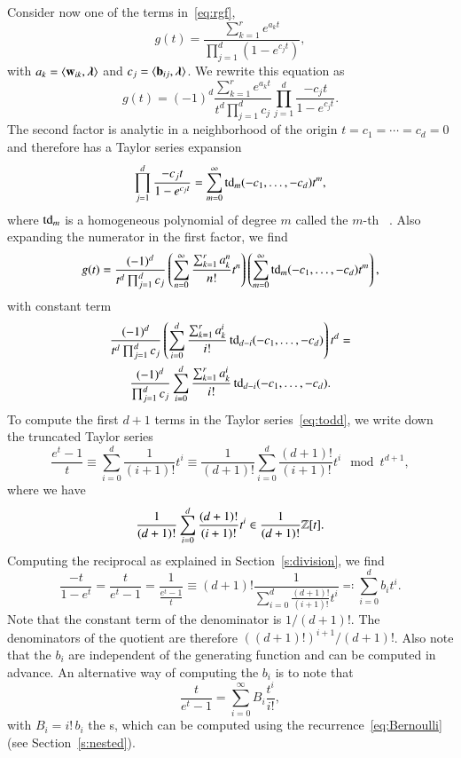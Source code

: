 Consider now one of the terms in~\eqref{eq:rgf},
$$
g(t) =
    \frac{\sum_{k=1}^{r} e^{a_k t}}
	 {\prod_{j=1}^{d}\left(1-e^{c_j t}\right)}
,
$$
with $a_k = \sp{w_{ik}}{\lambda}$ and $c_j = \sp{b_{ij}}{\lambda}$.
We rewrite this equation as
$$
g(t) =
(-1)^d
    \frac{\sum_{k=1}^{r} e^{a_k t}}
	 {t^d \prod_{j=1}^d c_j}
    \prod_{j=1}^d \frac{-c_j t}
	 {1-e^{c_j t}}
.
$$
The second factor is analytic in a neighborhood of the origin
$t = c_1 = \cdots = c_d = 0$ and therefore has a Taylor series expansion
\begin{equation}
\label{eq:todd}
    \prod_{j=1}^d \frac{-c_j t}
	 {1-e^{c_j t}}
=
    \sum_{m=0}^{\infty} \todd_m(-c_1, \ldots, -c_d) t^m
,
\end{equation}
where $\operatorname{td}_m$ is a homogeneous polynomial of degree $m$ called
the $m$-th ~\cite{Barvinok1999}.
Also expanding the numerator in the first factor, we find
$$
g(t)  = \frac{(-1)^d}{t^d \prod_{j=1}^d c_j}
	    \left(
		\sum_{n=0}^{\infty}\frac{\sum_{k=1}^{r} a_k^n}{n!} t^n
	    \right)
	    \left(
		\sum_{m=0}^{\infty} \operatorname{td}_m(-c_1, \ldots, -c_d) t^m
	    \right)
,
$$
with constant term
\begin{multline}
\label{eq:todd:constant}
\frac{(-1)^d}{t^d \prod_{j=1}^d c_j}
    \left(\sum_{i=0}^d \frac{\sum_{k=1}^{r} a_k^i}{i!}
		    \todd_{d-i}(-c_1, \ldots, -c_d)\right)t^d
= \\
\frac{(-1)^d}{\prod_{j=1}^d c_j}
    \sum_{i=0}^d \frac{\sum_{k=1}^{r} a_k^i}{i!} \todd_{d-i}(-c_1, \ldots, -c_d)
.
\end{multline}
To compute the first $d+1$ terms in the Taylor series~\eqref{eq:todd},
we write down the truncated Taylor series
$$
\frac{e^t -1}t \equiv
	\sum_{i=0}^d \frac 1{(i+1)!} t^i \equiv
	\frac 1 {(d+1)!} \sum_{i=0}^d \frac{(d+1)!}{(i+1)!} t^i
\mod t^{d+1}
,
$$
where we have
$$
	\frac 1 {(d+1)!} \sum_{i=0}^d \frac{(d+1)!}{(i+1)!} t^i
		\in \frac 1{(d+1)!} \mathbb{Z}[t]
.
$$
Computing the reciprocal as explained in Section~\ref{s:division},
we find
\begin{equation}
\label{eq:t-exp-1}
\frac{-t}{1-e^t} =
\frac{t}{e^t-1} = \frac 1{\frac{e^t -1}t}
\equiv (d+1)! \frac 1{\sum_{i=0}^d \frac{(d+1)!}{(i+1)!} t^i}
\eqqcolon \sum_{i=0}^d b_i t^i
.
\end{equation}
Note that the constant term of the denominator is $1/(d+1)!$.
The denominators of the quotient are therefore $((d+1)!)^{i+1}/(d+1)!$.
Also note that the $b_i$ are independent of the generating function
and can be computed in advance.
An alternative way of computing the $b_i$ is to note that
$$
\frac{t}{e^t-1} = \sum_{i=0}^\infty B_i \frac{t^i}{i!}
,
$$
with $B_i = i! \, b_i$ the s, which can be computed
using the recurrence~\eqref{eq:Bernoulli} (see Section~\ref{s:nested}).

